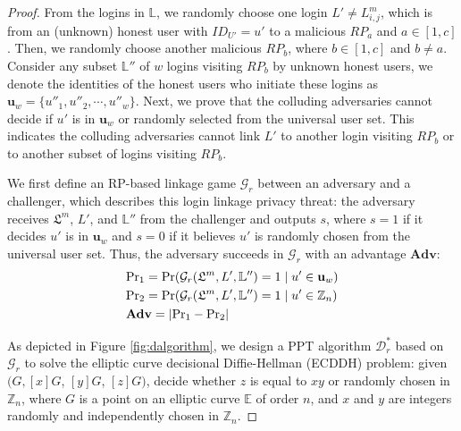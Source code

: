   \begin{proof} 
  From the logins in $\mathbb{L}$,
  we randomly choose one login $L' \neq L^m_{i,j}$,
  which is from an (unknown) honest user with $ID_{U'}=u'$ to a malicious $RP_a$ and $a \in [1,c]$.
  Then, we randomly choose another malicious $RP_b$, where $b \in [1,c]$ and $b \neq a$.
  Consider any subset $\mathbb{L}''$ of $w$ logins visiting $RP_b$ by unknown honest users,
  we denote the identities of the honest users who initiate these logins as $\mathbf{u}_w=\{{u''_1}, {u''_2}, \cdots, {u''_w}\}$.
  Next, we prove that the colluding adversaries cannot decide if $u'$ is in $\mathbf{u}_w$ or randomly selected from the universal user set.
  This indicates the colluding adversaries cannot link $L'$ to another login visiting $RP_b$
  or to another subset of logins visiting $RP_b$.

  We first define an RP-based linkage game $\mathcal{G}_r$ between an adversary and a challenger, which describes this login linkage privacy threat: the adversary receives $\mathfrak{L}^m$, $L'$, and $\mathbb{L}''$ from the challenger and outputs $s$, where $s = 1$ if it decides $u'$ is in $\mathbf{u}_w$ %
  and $s=0$ if it believes $u'$ is randomly chosen from the universal user set.
  Thus, the adversary succeeds in $\mathcal{G}_r$ with an advantage $\mathbf{Adv}$:
  \begin{align*}
  &{\rm Pr}_1={\rm Pr}(\mathcal{G}_r(\mathfrak{L}^m, L', \mathbb{L}'')=1 \;| \; u' \in \mathbf{u}_w)  \\
  &{\rm Pr}_2={\rm Pr}(\mathcal{G}_r(\mathfrak{L}^m, L', \mathbb{L}'')=1 \; | \; u' \in \mathbb{Z}_n)\\
  &{\mathbf{Adv}}=|{\rm Pr}_1-{\rm Pr}_2|
  \end{align*}

  As depicted in Figure \ref{fig:dalgorithm}, we design a PPT algorithm $\mathcal{D}^*_r$ based on $\mathcal{G}_r$ to solve the elliptic curve decisional Diffie-Hellman (ECDDH) problem: given $(G, [x]G$, $[y]G$, $[z]G)$, decide whether $z$ is equal to $xy$ or randomly chosen in $\mathbb{Z}_n$, where $G$ is a point on an elliptic curve $\mathbb{E}$ of order $n$, and $x$ and $y$ are integers randomly and independently chosen in $\mathbb{Z}_n$.


\end{proof}
